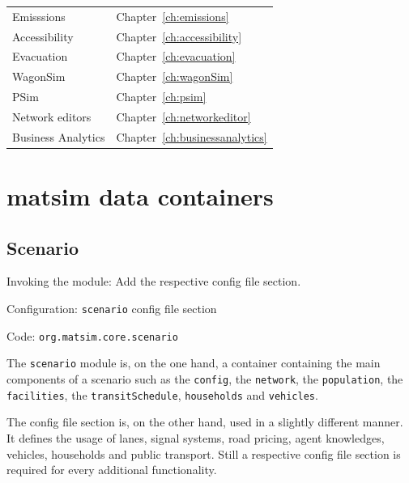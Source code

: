 \begin{table}
\begin{longtable}[c]{|l|l|}
	Emisssions & Chapter~\ref{ch:emissions} \\
	Accessibility & Chapter~\ref{ch:accessibility} \\
	Evacuation & Chapter~\ref{ch:evacuation}  \\
	WagonSim & Chapter~\ref{ch:wagonSim} \\
	PSim & Chapter~\ref{ch:psim} \\
	Network editors &  Chapter~\ref{ch:networkeditor} \\
	Business Analytics & Chapter~\ref{ch:businessanalytics} \\
	\hline
\end{longtable}
\end{table}

\section{\acrshort{matsim} data containers}
\label{sec:matsim-containers}

\subsection{Scenario}
\label{sec:scenario}
\begin{compactitem}
\item Invoking the module: Add the respective config file section.
\item Configuration: \lstinline|scenario| config file section 
\item Code: \lstinline|org.matsim.core.scenario|
\end{compactitem}

The \lstinline|scenario| module is, on the one hand, a container containing the main components of a scenario such as the \lstinline|config|, the \lstinline|network|, the \lstinline|population|, the \lstinline|facilities|, the \lstinline|transitSchedule|, \lstinline|households| and \lstinline|vehicles|.

The config file section is, on the other hand, used in a slightly different manner. It defines the usage of lanes, signal systems, road pricing, agent knowledges, vehicles, households and public transport. Still a respective config file section is required for every additional functionality. 

